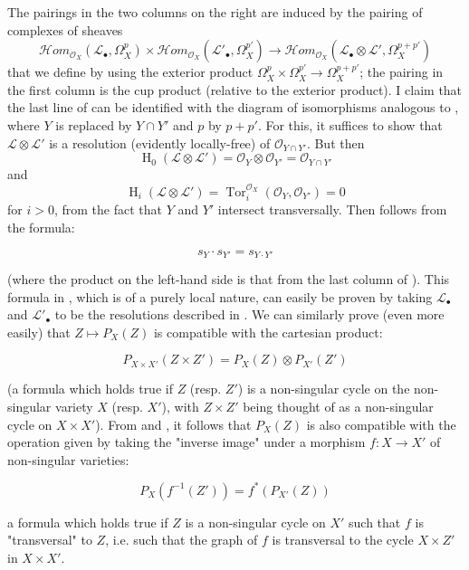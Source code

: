 \begin{cproof}
  The pairings in the two columns on the right are induced by the pairing of complexes of sheaves
  \[
    \mathcal{H}om_{\mathcal{O}_X}(\mathcal{L}_\bullet,\Omega_X^p) \times \mathcal{H}om_{\mathcal{O}_X}(\mathcal{L}'_\bullet,\Omega_X^{p'})
    \to \mathcal{H}om_{\mathcal{O}_X}(\mathcal{L}_\bullet\otimes\mathcal{L}',\Omega_X^{p+p'})
  \]
  that we define by using the exterior product $\Omega_X^p\times\Omega_X^{p'}\to\Omega_X^{p+p'}$;
  the pairing in the first column is the cup product (relative to the exterior product).
  I claim that the last line of can be identified with the diagram of isomorphisms analogous to , where $Y$ is replaced by $Y\cap Y'$ and $p$ by $p+p'$.
  For this, it suffices to show that $\mathcal{L}\otimes\mathcal{L}'$ is a resolution (evidently locally-free) of $\mathcal{O}_{Y\cap Y'}$.
  But then
  \[
    \operatorname{H}_0(\mathcal{L} \otimes \mathcal{L}')
    = \mathcal{O}_Y \otimes \mathcal{O}_{Y'}
    = \mathcal{O}_{Y \cap Y'}
  \]
  and
  \[
    \operatorname{H}_i(\mathcal{L} \otimes \mathcal{L}')
    = \operatorname{Tor}_i^{\mathcal{O}_X}(\mathcal{O}_Y,\mathcal{O}_{Y'})
    = 0
  \]
  for $i>0$, from the fact that $Y$ and $Y'$ intersect transversally.
  Then  follows from the formula:

  \begin{equation}\tag{4.6}\label{fga1-equation-4.6}
    s_Y\cdot s_{Y'} = s_{Y\cdot Y'}
  \end{equation}

  (where the product on the left-hand side is that from the last column of ).
  This formula in , which is of a purely local nature, can easily be proven by taking $\mathcal{L}_\bullet$ and $\mathcal{L}'_\bullet$ to be the resolutions described in .
  We can similarly prove (even more easily) that $Z\mapsto P_X(Z)$ is compatible with the cartesian product:

  \begin{equation}\tag{4.7}\label{fga1-equation-4.7}
    P_{X\times X'}(Z\times Z') = P_X(Z)\otimes P_{X'}(Z')
  \end{equation}

  (a formula which holds true if $Z$ (resp. $Z'$) is a non-singular cycle on the non-singular variety $X$ (resp. $X'$), with $Z\times Z'$ being thought of as a non-singular cycle on $X\times X'$).
  From  and , it follows that $P_X(Z)$ is also compatible with the operation given by taking the "inverse image" under a morphism $f\colon X\to X'$ of non-singular varieties:

  \begin{equation}\tag{4.8}\label{fga1-equation-4.8}
    P_X(f^{-1}(Z')) = f^*(P_{X'}(Z))
  \end{equation}

  a formula which holds true if $Z$ is a non-singular cycle on $X'$ such that $f$ is "transversal" to $Z$, i.e. such that the graph of $f$ is transversal to the cycle $X\times Z'$ in $X\times X'$.
\end{cproof}

